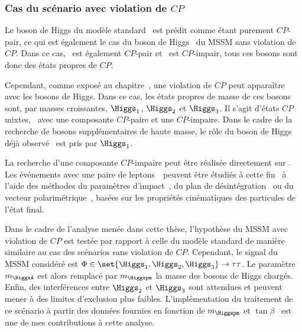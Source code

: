 \subsubsection{Cas du scénario avec violation de $CP$}
Le boson de Higgs du modèle standard \higgsSM\ est prédit comme étant purement $CP$-pair,
ce qui est également le cas du boson de Higgs \higgsMSSM\ du MSSM sans violation de $CP$.
Dans ce cas, \Higgs\ est également $CP$-pair et \HiggsA\ est $CP$-impair,
tous ces bosons sont donc des états propres de $CP$.
\par
Cependant, comme exposé au chapitre~,
une violation de $CP$ peut apparaître avec les bosons de Higgs.
Dans ce cas, les états propres de masse de ces bosons sont, par masses croissantes,
$\Higgs_1$, $\Higgs_2$ et $\Higgs_3$.
Il s'agit d'états $CP$ mixtes,
\ie\ avec une composante $CP$-paire et une $CP$-impaire.
Dans le cadre de la recherche de bosons supplémentaires de haute masse,
le rôle du boson de Higgs déjà observé \higgs\ est pris par $\Higgs_1$.
\par
La recherche d'une composante $CP$-impaire peut être réalisée directement sur \higgs.
Les événements avec une paire de leptons~\tau\ peuvent être étudiés à cette fin~\cite{Bourgatte_thesis}
à l'aide des méthodes du paramètres d'impact~\cite{BERGE2013488}, du plan de désintégration~\cite{Desch_2004} ou du vecteur polarimétrique~\cite{Cherepanov_cpv},
basées sur les propriétés cinématiques des particules de l'état final.
\par
Dans le cadre de l'analyse menée dans cette thèse,
l'hypothèse du MSSM avec violation de $CP$
est testée par rapport à celle du modèle standard de manière similaire
au cas des scénarios sans violation de $CP$.
Cependant,
le signal du MSSM considéré est
$\Phi\in\set{\Higgs_1,\Higgs_2,\Higgs_3}\to\tau\tau$.
Le paramètre $m_{\HiggsA}$ est alors remplacé par $m_{\Higgspm}$ la masse des bosons de Higgs chargés.
Enfin, des interférences entre $\Higgs_2$ et $\Higgs_3$ sont attendues et peuvent mener à des limites d'exclusion plus faibles.
L'implémentation du traitement de ce scénario à partir des données fournies en fonction de $m_{\Higgspm}$ et $\tan\beta$~\cite{MSSMneutralHiggsTwiki}
est une de mes contributions à cette analyse.

